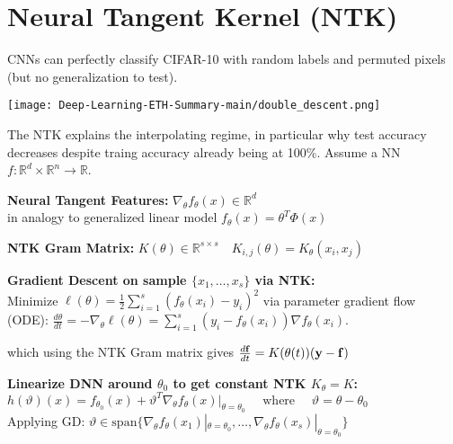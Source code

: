 \section*{Neural Tangent Kernel (NTK)}
CNNs can perfectly classify CIFAR-10 with random labels and permuted pixels (but no generalization to test).

\texttt{[image: Deep-Learning-ETH-Summary-main/double\_descent.png]}

The NTK explains the interpolating regime, in particular why test accuracy decreases despite traing accuracy already being at 100\%. Assume a NN \(f : \mathbb{R}^d \times \mathbb{R}^n \to \mathbb R\).

\textbf{Neural Tangent Features:} \(\nabla_\theta f_\theta(x) \in \mathbb{R}^d\)\\
in analogy to generalized linear model \(f_\theta(x) = \theta^T \Phi(x)\)


\textbf{NTK Gram Matrix:} $K(\theta) \in \mathbb{R}^{s \times s}\quad K_{i,j}(\theta) = K_\theta(x_i, x_j)$

\textbf{Gradient Descent on sample $\{x_1, \ldots, x_s\}$ via NTK:}\\
Minimize \(\ell(\theta) = \frac{1}{2} \sum_{i=1}^s (f_\theta(x_i) - y_i)^2 \) via parameter gradient flow (ODE): \(\frac{d\theta}{dt} = - \nabla_\theta \ell(\theta) = \sum_{i=1}^s (y_i - f_\theta(x_i)) \nabla f_\theta(x_i)\).

which using the NTK Gram matrix gives $\frac{d \bf f}{dt} = K(\theta(t)) (\mathbf y - \mathbf f)$

\textbf{Linearize DNN around $\theta_0$ to get constant NTK $K_\theta = K$:}\\
$h(\vartheta)(x) = f_{\theta_0}(x) + \vartheta^T \nabla_\theta f_\theta(x) \vert_{\theta = \theta_0}  \quad \text{ where } \quad \vartheta = \theta - \theta_0$\\
Applying GD: $\vartheta \in \mathrm{span} \{\nabla_\theta f_\theta(x_1)|_{\theta=\theta_0}, \ldots, \nabla_\theta f_\theta(x_s)|_{\theta=\theta_0}\}$


